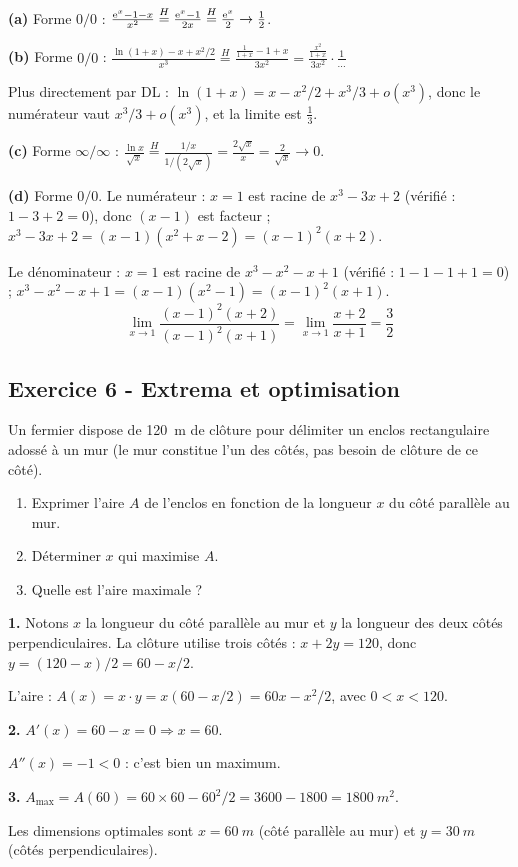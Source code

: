 \documentclass[12pt,a4paper]{article}
\begin{document}
\begin{boitecorrige}
\textbf{(a)} Forme $0/0$ :
$\frac{\mathrm{e}^x-1-x}{x^2}\stackrel{H}{=}\frac{\mathrm{e}^x-1}{2x}\stackrel{H}{=}\frac{\mathrm{e}^x}{2}\to\frac{1}{2}$.

\textbf{(b)} Forme $0/0$ :
$\frac{\ln(1+x)-x+x^2/2}{x^3}\stackrel{H}{=}\frac{\frac{1}{1+x}-1+x}{3x^2}=\frac{\frac{x^2}{1+x}}{3x^2}\cdot\frac{1}{...}$

Plus directement par DL : $\ln(1+x) = x-x^2/2+x^3/3+o(x^3)$, donc le numérateur vaut $x^3/3+o(x^3)$, et la limite est $\frac{1}{3}$.

\textbf{(c)} Forme $\infty/\infty$ :
$\frac{\ln x}{\sqrt{x}}\stackrel{H}{=}\frac{1/x}{1/(2\sqrt{x})}=\frac{2\sqrt{x}}{x}=\frac{2}{\sqrt{x}}\to0$.

\textbf{(d)} Forme $0/0$. Le numérateur : $x=1$ est racine de $x^3-3x+2$ (vérifié : $1-3+2=0$), donc $(x-1)$ est facteur ; $x^3-3x+2=(x-1)(x^2+x-2)=(x-1)^2(x+2)$.

Le dénominateur : $x=1$ est racine de $x^3-x^2-x+1$ (vérifié : $1-1-1+1=0$) ; $x^3-x^2-x+1=(x-1)(x^2-1)=(x-1)^2(x+1)$.
\[
\lim_{x\to1}\frac{(x-1)^2(x+2)}{(x-1)^2(x+1)} = \lim_{x\to1}\frac{x+2}{x+1} = \frac{3}{2}
\]
\end{boitecorrige}

\subsection*{Exercice 6 - Extrema et optimisation \niveau{\difficile}}

\begin{boiteexercice}
Un fermier dispose de \qty{120}{m} de clôture pour délimiter un enclos rectangulaire adossé à un mur (le mur constitue l'un des côtés, pas besoin de clôture de ce côté).
\begin{enumerate}
  \item Exprimer l'aire $A$ de l'enclos en fonction de la longueur $x$ du côté parallèle au mur.
  \item Déterminer $x$ qui maximise $A$.
  \item Quelle est l'aire maximale ?
\end{enumerate}
\end{boiteexercice}

\begin{boitecorrige}
\textbf{1.} Notons $x$ la longueur du côté parallèle au mur et $y$ la longueur des deux côtés perpendiculaires. La clôture utilise trois côtés : $x + 2y = 120$, donc $y = (120-x)/2 = 60-x/2$.

L'aire : $A(x) = x\cdot y = x(60-x/2) = 60x - x^2/2$, avec $0<x<120$.

\textbf{2.} $A'(x) = 60 - x = 0 \Rightarrow x = 60$.

$A''(x) = -1 < 0$ : c'est bien un maximum.

\textbf{3.} $A_{\max} = A(60) = 60\times60 - 60^2/2 = 3600 - 1800 = \qty{1800}{m^2}$.

Les dimensions optimales sont $x = \qty{60}{m}$ (côté parallèle au mur) et $y = \qty{30}{m}$ (côtés perpendiculaires).
\end{boitecorrige}
\end{document}
